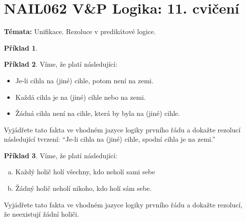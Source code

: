 \documentclass[a4paper]{article}
\theoremstyle{definition}
\newtheorem{problem}{Příklad}
\begin{document}
\section*{NAIL062 V\&P Logika: 11. cvičení}


\textbf{Témata:}
Unifikace. Rezoluce v predikátové logice.


\medskip\begin{problem}
 
\end{problem}


\medskip\begin{problem} Víme, že platí následující:
    \begin{itemize}
        \item Je-li cihla na (jiné) cihle, potom není na zemi.
        \item Každá cihla je na (jiné) cihle nebo na zemi.
        \item Žádná cihla není na cihle, která by byla na (jiné) cihle.
    \end{itemize}
    Vyjádřete tato fakta ve vhodném jazyce logiky prvního řádu a dokažte rezolucí následující tvrzení: ``Je-li cihla na (jiné) cihle, spodní cihla je na zemi.''
\end{problem}
        
    
\medskip\begin{problem} Víme, že platí následující:
    \begin{enumerate}[(a)]
        \item Každý holič holí všechny, kdo neholí sami sebe
        \item Žádný holič neholí nikoho, kdo holí sám sebe.
    \end{enumerate}
    Vyjádřete tato fakta ve vhodném jazyce logiky prvního řádu a dokažte rezolucí, že neexistují žádní holiči.
\end{problem}
\end{document}
